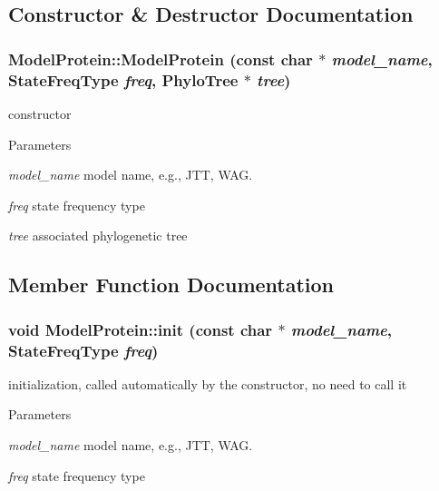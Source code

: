 \subsection{Constructor \& Destructor Documentation}
\hypertarget{classModelProtein_a962861c07a7741cdefb856572fff0757}{
\subsubsection[{ModelProtein}]{\setlength{\rightskip}{0pt plus 5cm}ModelProtein::ModelProtein (const char $\ast$ {\em model\_\-name}, \/  StateFreqType {\em freq}, \/  {\bf PhyloTree} $\ast$ {\em tree})}}
\label{classModelProtein_a962861c07a7741cdefb856572fff0757}
constructor 
\begin{DoxyParams}{Parameters}
\item[{\em model\_\-name}]model name, e.g., JTT, WAG. \item[{\em freq}]state frequency type \item[{\em tree}]associated phylogenetic tree \end{DoxyParams}


\subsection{Member Function Documentation}
\hypertarget{classModelProtein_a752778117ce79f5c0161397835fc6bf0}{
\subsubsection[{init}]{\setlength{\rightskip}{0pt plus 5cm}void ModelProtein::init (const char $\ast$ {\em model\_\-name}, \/  StateFreqType {\em freq})}}
\label{classModelProtein_a752778117ce79f5c0161397835fc6bf0}
initialization, called automatically by the constructor, no need to call it 
\begin{DoxyParams}{Parameters}
\item[{\em model\_\-name}]model name, e.g., JTT, WAG. \item[{\em freq}]state frequency type \end{DoxyParams}


